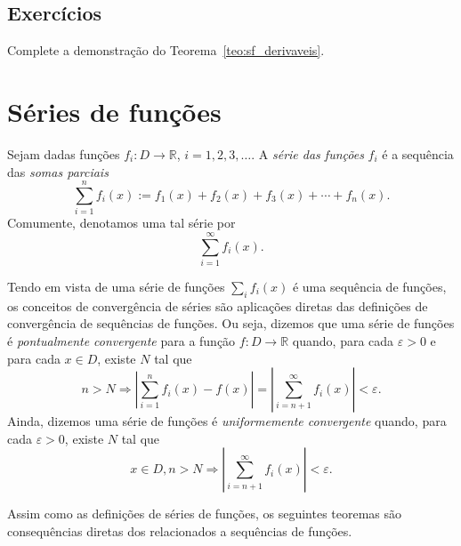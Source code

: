\subsection*{Exercícios}

\begin{exer}
  Complete a demonstração do Teorema~\ref{teo:sf_derivaveis}.
\end{exer}

\section{Séries de funções}\label{cap_ssfuncoes_sec_serf}

\begin{defn}
  Sejam dadas funções $f_i:D\to\mathbb{R}$, $i=1, 2, 3, \ldots$. A \emph{série das funções} $f_i$ é a sequência das \emph{somas parciais}
  \begin{equation}
    \sum_{i=1}^n f_i(x) := f_1(x) + f_2(x) + f_3(x) + \cdots + f_n(x).
  \end{equation}
Comumente, denotamos uma tal série por
\begin{equation}
  \sum_{i=1}^\infty f_i(x).
\end{equation}
\end{defn}

Tendo em vista de uma série de funções $\sum_i f_i(x)$ é uma sequência de funções, os conceitos de convergência de séries são aplicações diretas das definições de convergência de sequências de funções. Ou seja, dizemos que uma série de funções é \emph{pontualmente convergente} para a função $f:D\to\mathbb{R}$ quando, para cada $\varepsilon>0$ e para cada $x\in D$, existe $N$ tal que
\begin{equation}
  n>N \Rightarrow \left|\sum_{i=1}^n f_i(x) - f(x)\right| = \left|\sum_{i=n+1}^\infty f_i(x)\right| < \varepsilon.
\end{equation}
Ainda, dizemos uma série de funções é \emph{uniformemente convergente} quando, para cada $\varepsilon>0$, existe $N$ tal que
\begin{equation}
  x\in D, n>N \Rightarrow \left|\sum_{i=n+1}^\infty f_i(x)\right| <  \varepsilon.
\end{equation}

Assim como as definições de séries de funções, os seguintes teoremas são consequências diretas dos relacionados a sequências de funções.

